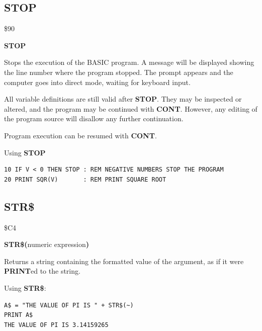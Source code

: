 
\newpage
\subsection{STOP}
\begin{description}[leftmargin=2cm,style=nextline]
\item [Token:] \$90
\item [Format:] {\bf STOP}
\item [Usage:] Stops the execution
               of the BASIC program.
               A message will be displayed showing the line number where the program stopped.
               The  prompt
               appears and the computer goes into direct mode,
               waiting for keyboard input.

\item [Remarks:]
               All variable definitions are still valid after {\bf STOP}.
               They may be inspected or altered, and the
               program may be continued with {\bf CONT}.
               However, any editing of the program source
               will disallow any further continuation.

               Program execution can be resumed with {\bf CONT}.


\item [Example:] Using {\bf STOP}
\begin{tcolorbox}[colback=black,coltext=white]
\verbatimfont{\codefont}
\begin{verbatim}
10 IF V < 0 THEN STOP : REM NEGATIVE NUMBERS STOP THE PROGRAM
20 PRINT SQR(V)       : REM PRINT SQUARE ROOT
\end{verbatim}
\end{tcolorbox}
\end{description}


\newpage
\subsection{STR\$}
\begin{description}[leftmargin=2cm,style=nextline]
\item [Token:] \$C4
\item [Format:] {\bf STR\$(}numeric expression{\bf)}
\item [Usage:] Returns a string
               containing the formatted value of the argument,
               as if it were {\bf PRINT}ed to the string.

\item [Example:] Using {\bf STR\$}:
\begin{tcolorbox}[colback=black,coltext=white]
\verbatimfont{\codefont}
\begin{verbatim}
A$ = "THE VALUE OF PI IS " + STR$(~)
PRINT A$
THE VALUE OF PI IS 3.14159265
\end{verbatim}
\end{tcolorbox}
\end{description}


